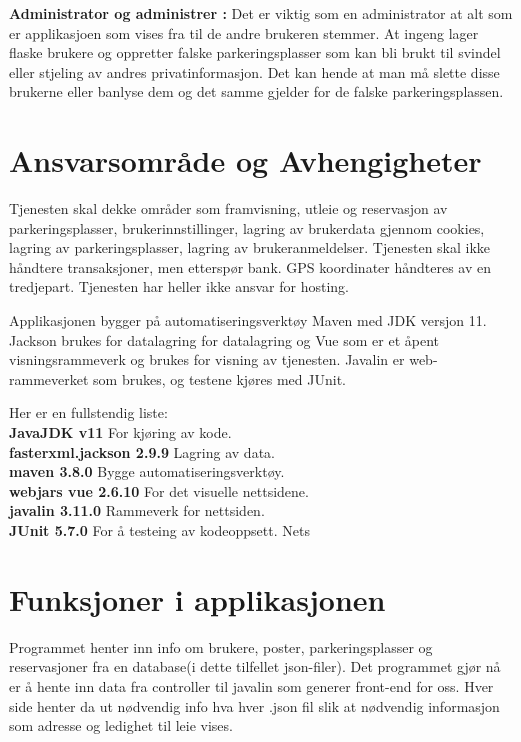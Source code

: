\documentclass[12pt]{article}
\begin{document}
    \textbf{Administrator og administrer :} Det er viktig som en administrator at alt som er applikasjoen som vises fra til de andre brukeren stemmer. At ingeng lager flaske brukere og oppretter falske parkeringsplasser som kan bli brukt til svindel eller stjeling av andres privatinformasjon. Det kan hende at man må slette disse brukerne eller banlyse dem og det samme gjelder for de falske parkeringsplassen. 


\section{Ansvarsområde og Avhengigheter}
Tjenesten skal dekke områder som framvisning, utleie og reservasjon av parkeringsplasser, brukerinnstillinger, lagring av brukerdata gjennom cookies, lagring av parkeringsplasser, lagring av brukeranmeldelser. Tjenesten skal ikke håndtere transaksjoner, men etterspør bank. GPS koordinater håndteres av en tredjepart. Tjenesten har heller ikke ansvar for hosting.

Applikasjonen bygger på automatiseringsverktøy Maven med JDK versjon 11. Jackson brukes for datalagring for datalagring og Vue som er et åpent visningsrammeverk og brukes for visning av tjenesten. Javalin er web-rammeverket som brukes, og testene kjøres med JUnit.

Her er en fullstendig liste:\\
\textbf{JavaJDK v11} For kjøring av kode.
\\\textbf{fasterxml.jackson 2.9.9} Lagring av data.
\\\textbf{maven 3.8.0} Bygge automatiseringsverktøy.
\\\textbf{webjars vue 2.6.10} For det visuelle nettsidene.
\\\textbf{javalin 3.11.0} Rammeverk for nettsiden.
\\\textbf{JUnit 5.7.0} For å testeing av kodeoppsett.
Nets 


\section{Funksjoner i applikasjonen}

Programmet henter inn info om brukere, poster, parkeringsplasser og reservasjoner fra en database(i dette tilfellet json-filer). Det programmet gjør nå er å hente inn data fra controller til javalin som generer front-end for oss. Hver side henter da ut nødvendig info hva hver .json fil slik at nødvendig informasjon som adresse og ledighet til leie vises.
\end{document}
